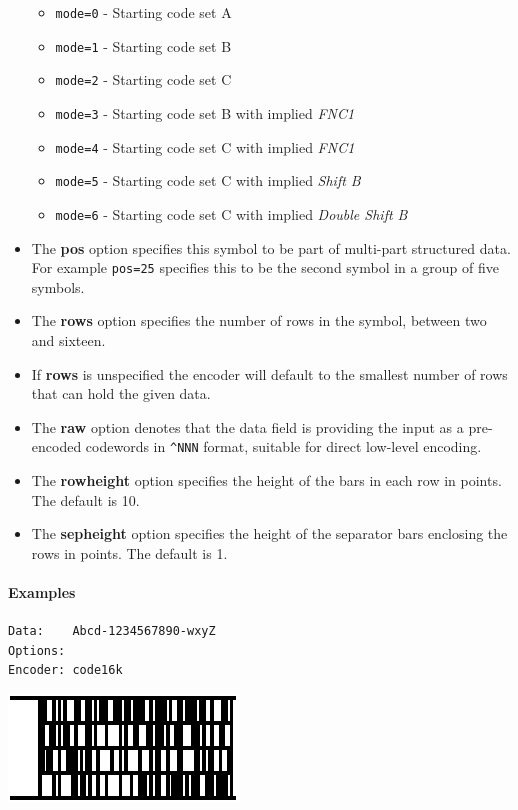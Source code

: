 \begin{itemize}
  \begin{itemize}
  \tightlist
  \item
    \texttt{mode=0} - Starting code set A
  \item
    \texttt{mode=1} - Starting code set B
  \item
    \texttt{mode=2} - Starting code set C
  \item
    \texttt{mode=3} - Starting code set B with implied \emph{FNC1}
  \item
    \texttt{mode=4} - Starting code set C with implied \emph{FNC1}
  \item
    \texttt{mode=5} - Starting code set C with implied \emph{Shift B}
  \item
    \texttt{mode=6} - Starting code set C with implied \emph{Double
    Shift B}
  \end{itemize}
\item
  The \textbf{pos} option specifies this symbol to be part of multi-part
  structured data. For example \texttt{pos=25} specifies this to be the
  second symbol in a group of five symbols.
\item
  The \textbf{rows} option specifies the number of rows in the symbol,
  between two and sixteen.
\item
  If \textbf{rows} is unspecified the encoder will default to the
  smallest number of rows that can hold the given data.
\item
  The \textbf{raw} option denotes that the data field is providing the
  input as a pre-encoded codewords in \texttt{\^{}NNN} format, suitable
  for direct low-level encoding.
\item
  The \textbf{rowheight} option specifies the height of the bars in each
  row in points. The default is 10.
\item
  The \textbf{sepheight} option specifies the height of the separator
  bars enclosing the rows in points. The default is 1.
\end{itemize}

\hypertarget{examples-41}{%
\paragraph{Examples}\label{examples-41}}

\begin{verbatim}
Data:    Abcd-1234567890-wxyZ
Options: 
Encoder: code16k
\end{verbatim}

\includegraphics{images/code16k-1.eps}

